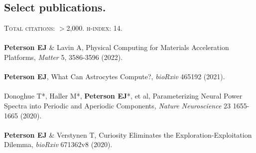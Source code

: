 \documentclass[margin,line]{res}
\begin{document}
\begin{resume}
\section{\sc Select publications.}
\textsc{Total citations}: $>$2,000. \textsc{h-index}: 14.
\\ 
\vspace{-.25cm} 
\\
\textbf{Peterson EJ} \& Lavin A, Physical Computing for Materials Acceleration Platforms, \textit{Matter} 5, 3586-3596 (2022).
\\ 
\vspace{-.35cm} 
\\
\textbf{Peterson EJ}, What Can Astrocytes Compute?, \emph{bioRxiv} 465192 (2021).
\\ 
\vspace{-.35cm} 
\\
Donoghue T*, Haller M*, \textbf{Peterson EJ}*, et al, Parameterizing Neural Power Spectra into Periodic and Aperiodic Components, \emph{Nature Neuroscience} 23 1655-1665 (2020). 
\\ 
\vspace{-.35cm} 
\\
\textbf{Peterson EJ} \& Verstynen T, Curiosity Eliminates the Exploration-Exploitation Dilemma, \emph{bioRxiv} 671362v8 (2020). 

\end{resume}
\end{document}

